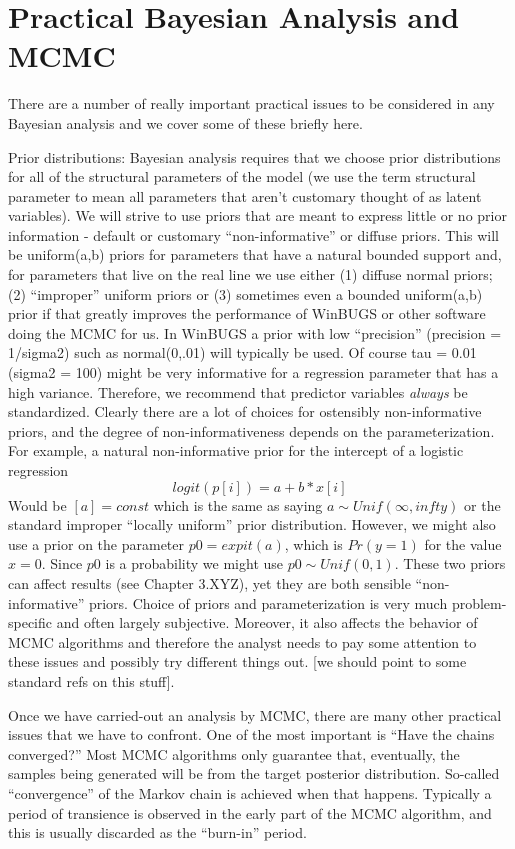 \section{Practical Bayesian Analysis and MCMC}

There are a number of really important practical issues to be considered in any Bayesian analysis and we cover some of these briefly here.

Prior distributions: Bayesian analysis requires that we choose prior
distributions for all of the structural parameters of the model (we
use the term structural parameter to mean all parameters that aren't
customary thought of as latent variables). We will strive to use
priors that are meant to express little or no prior information -
default or customary ``non-informative'' or diffuse priors. This will be uniform(a,b) priors for parameters that have a natural bounded support and, for parameters that live on the real line we use either (1) diffuse normal priors; (2) ``improper'' uniform priors or (3) sometimes even a bounded uniform(a,b) prior if that greatly improves the performance of WinBUGS or other software doing the MCMC for us.  In WinBUGS a prior with low ``precision'' (precision = 1/sigma2) such as normal(0,.01) will typically be used. Of course tau = 0.01 (sigma2 = 100) might be very informative for a regression parameter that has a high variance. Therefore, we recommend that predictor variables {\it always} be standardized. Clearly  there are a lot of choices for ostensibly non-informative priors, and the degree of non-informativeness depends on the parameterization. For example, a natural non-informative prior for the intercept of a logistic regression
\[
logit(p[i]) = a + b*x[i]
\]
Would be $[a] = const$ which is the same as saying $a \sim Unif(\infty,infty)$ or the standard improper ``locally uniform'' prior distribution.  However, we might also use a prior on the parameter $p0 = expit(a)$, which is $Pr(y=1)$ for the value $x=0$. Since $p0$ is a probability we might use $p0 \sim Unif(0,1)$. These two priors can affect results (see Chapter 3.XYZ), yet they are both sensible ``non-informative'' priors. Choice of priors and parameterization is very much problem-specific and often largely subjective. Moreover, it also affects the behavior of MCMC algorithms and therefore the analyst needs to pay some attention to these issues and possibly try different things out. [we should point to some standard refs on this stuff].

Once we have carried-out an analysis by MCMC, there are many other practical issues that we have to confront.  One of the most important is ``Have the chains converged?'' Most MCMC algorithms only guarantee that, eventually, the samples being generated will be from the target posterior distribution. So-called ``convergence'' of the Markov chain is achieved when that happens.  Typically a period of transience is observed in the early part of the MCMC algorithm, and this is usually discarded as the ``burn-in'' period.  

